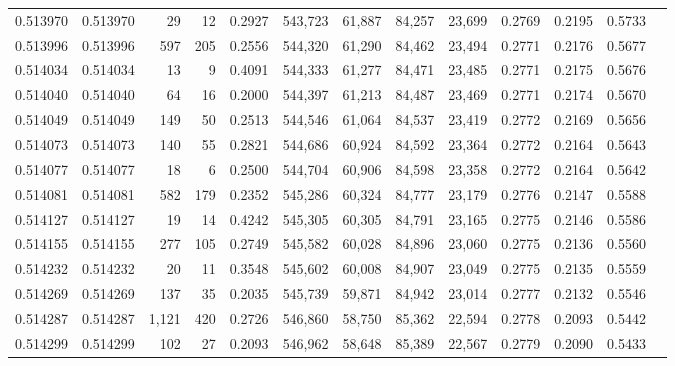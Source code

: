 \begin{tabular}{rrrrrrrrrrrrr}
0.513970 & 0.513970 &    29 &    12 &                                     0.2927 & 543,723 &  61,887 &  84,257 &  23,699 & 0.2769 & 0.2195 & 0.5733 \\
0.513996 & 0.513996 &   597 &   205 &                                     0.2556 & 544,320 &  61,290 &  84,462 &  23,494 & 0.2771 & 0.2176 & 0.5677 \\
0.514034 & 0.514034 &    13 &     9 &                                     0.4091 & 544,333 &  61,277 &  84,471 &  23,485 & 0.2771 & 0.2175 & 0.5676 \\
0.514040 & 0.514040 &    64 &    16 &                                     0.2000 & 544,397 &  61,213 &  84,487 &  23,469 & 0.2771 & 0.2174 & 0.5670 \\
0.514049 & 0.514049 &   149 &    50 &                                     0.2513 & 544,546 &  61,064 &  84,537 &  23,419 & 0.2772 & 0.2169 & 0.5656 \\
0.514073 & 0.514073 &   140 &    55 &                                     0.2821 & 544,686 &  60,924 &  84,592 &  23,364 & 0.2772 & 0.2164 & 0.5643 \\
0.514077 & 0.514077 &    18 &     6 &                                     0.2500 & 544,704 &  60,906 &  84,598 &  23,358 & 0.2772 & 0.2164 & 0.5642 \\
0.514081 & 0.514081 &   582 &   179 &                                     0.2352 & 545,286 &  60,324 &  84,777 &  23,179 & 0.2776 & 0.2147 & 0.5588 \\
0.514127 & 0.514127 &    19 &    14 &                                     0.4242 & 545,305 &  60,305 &  84,791 &  23,165 & 0.2775 & 0.2146 & 0.5586 \\
0.514155 & 0.514155 &   277 &   105 &                                     0.2749 & 545,582 &  60,028 &  84,896 &  23,060 & 0.2775 & 0.2136 & 0.5560 \\
0.514232 & 0.514232 &    20 &    11 &                                     0.3548 & 545,602 &  60,008 &  84,907 &  23,049 & 0.2775 & 0.2135 & 0.5559 \\
0.514269 & 0.514269 &   137 &    35 &                                     0.2035 & 545,739 &  59,871 &  84,942 &  23,014 & 0.2777 & 0.2132 & 0.5546 \\
0.514287 & 0.514287 & 1,121 &   420 &                                     0.2726 & 546,860 &  58,750 &  85,362 &  22,594 & 0.2778 & 0.2093 & 0.5442 \\
0.514299 & 0.514299 &   102 &    27 &                                     0.2093 & 546,962 &  58,648 &  85,389 &  22,567 & 0.2779 & 0.2090 & 0.5433 \\

\end{tabular}
